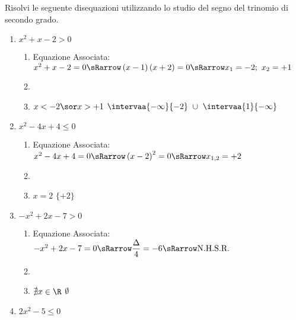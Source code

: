\begin{esempio}
Risolvi le seguente disequazioni utilizzando lo studio del segno del trinomio 
di secondo grado.

\begin{enumerate}
\item \(x^2+x-2>0\)

\begin{enumerate}
 \item
  Equazione Associata:~~\(x^2+x-2=0 \sRarrow 
                         \left(x-1 \right)\left(x+2\right)=0 \sRarrow 
                         x_1=-2;~x_2=+1\)
 \item 
                   {}
 \item 
                  {\(x<-2 \sor x>+1\)}
                  {\(\intervaa{-\infty}{-2}~\cup~\intervaa{1}{-\infty}\)}
\end{enumerate}

\item \(x^2-4x+4\le0\)

\begin{enumerate}
 \item
  Equazione Associata:~\(x^2-4x+4=0 \sRarrow 
                        \left(x-2 \right)^2=0 \sRarrow 
                        x_{1,2}=+2\)
 \item 
                   {}
 \item 
                  {\(x=2\)}
                  {\(\lbrace +2 \rbrace\)}
\end{enumerate}

\item \(-x^2+2x-7>0\)

\begin{enumerate}
 \item
  Equazione Associata:~\(-x^2+2x-7=0 \sRarrow 
                        \dfrac{\Delta}{4} = -6 \sRarrow 
                        \text{N.H.S.R.}\)
 \item 
                   {\parabolaamidmi}
 \item 
                  {\(\nexists x \in \R\)}
                  {\(\emptyset\)}
\end{enumerate}

\newpage %
\item \(2x^2-5 \le 0\)


\end{enumerate}
\end{esempio}
